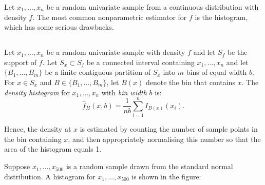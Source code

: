 Let $x_1,\ldots,x_n$ be a random univariate sample from a continuous distribution with density $f$. The most common nonparametric estimator for $f$ is the histogram, which has some serious drawbacks.
\subsection{}Let $x_1,\ldots,x_n$ be a random univariate sample with density $f$ and let $S_f$ be the support of $f$. Let $S_x\subset S_f$ be a connected interval containing $x_1,\ldots,x_n$ and let $\{B_1,\ldots,B_m\}$ be a finite contiguous partition of $S_x$ into $m$ bins of equal width $b$. For $x\in S_x$ and $B\in \{B_1,\ldots,B_m\}$, let $B(x)$ denote the bin that contains $x$. The {\it density histogram} for $x_1,\ldots,x_n$ with {\it bin width} $b$ is:
\begin{equation}
\hat{f}_H(x,b)=\frac{1}{nb}\sum^n_{i=1}I_{B(x)}(x_i).
\end{equation}

Hence, the density at $x$ is estimated by counting the number of sample points in the bin containing $x$, and then appropriately normalising this number so that the area of the histogram equals 1.

\begin{example}
Suppose $x_1,\ldots,x_{500}$ is a random sample drawn from the standard normal distribution. A histogram for $x_1,\ldots,x_{500}$ is shown in the figure:
\end{example}

